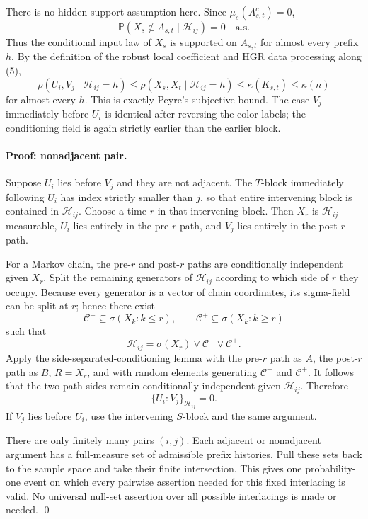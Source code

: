 There is no hidden support assumption here.  Since
$\mu_s(A_{s,t}^c)=0$,
\[
 \mathbb P(X_s\notin A_{s,t}\mid\mathcal H_{ij})=0
 \quad\text{a.s.}
\tag{6}
\]
Thus the conditional input law of $X_s$ is supported on $A_{s,t}$ for almost
every prefix $h$.  By the definition of the robust local coefficient and HGR
data processing along (5),
\[
 \rho(U_i,V_j\mid\mathcal H_{ij}=h)
 \le \rho(X_s,X_t\mid\mathcal H_{ij}=h)
 \le \kappa(K_{s,t})\le\kappa(n)
\tag{7}
\]
for almost every $h$.  This is exactly Peyre's subjective bound.  The case
$V_j$ immediately before $U_i$ is identical after reversing the color labels;
the conditioning field is again strictly earlier than the earlier block.

\paragraph{Proof: nonadjacent pair.}
Suppose $U_i$ lies before $V_j$ and they are not adjacent.  The $T$-block
immediately following $U_i$ has index strictly smaller than $j$, so that entire
intervening block is contained in $\mathcal H_{ij}$.  Choose a time $r$ in
that intervening block.  Then $X_r$ is $\mathcal H_{ij}$-measurable,
$U_i$ lies entirely in the pre-$r$ path, and $V_j$ lies entirely in the
post-$r$ path.

For a Markov chain, the pre-$r$ and post-$r$ paths are conditionally independent
given $X_r$.  Split the remaining generators of $\mathcal H_{ij}$ according
to which side of $r$ they occupy.  Because every generator is a vector of chain
coordinates, its sigma-field can be split at $r$; hence there exist
\[
 \mathcal C^-\subseteq\sigma(X_k:k\le r),\qquad
 \mathcal C^+\subseteq\sigma(X_k:k\ge r)
\]
such that
\[
 \mathcal H_{ij}=\sigma(X_r)\vee\mathcal C^-\vee\mathcal C^+.
\tag{8}
\]
Apply the side-separated-conditioning lemma with the pre-$r$ path as $A$, the
post-$r$ path as $B$, $R=X_r$, and with random elements generating
$\mathcal C^-$ and $\mathcal C^+$.  It follows that the two path sides remain
conditionally independent given $\mathcal H_{ij}$.  Therefore
\[
 \{U_i:V_j\}_{\mathcal H_{ij}}=0.
\tag{9}
\]
If $V_j$ lies before $U_i$, use the intervening $S$-block and the same argument.

There are only finitely many pairs $(i,j)$.  Each adjacent or nonadjacent
argument has a full-measure set of admissible prefix histories.  Pull these
sets back to the sample space and take their finite intersection.  This gives
one probability-one event on which every pairwise assertion needed for this
fixed interlacing is valid.  No universal null-set assertion over all possible
interlacings is made or needed. \qed


